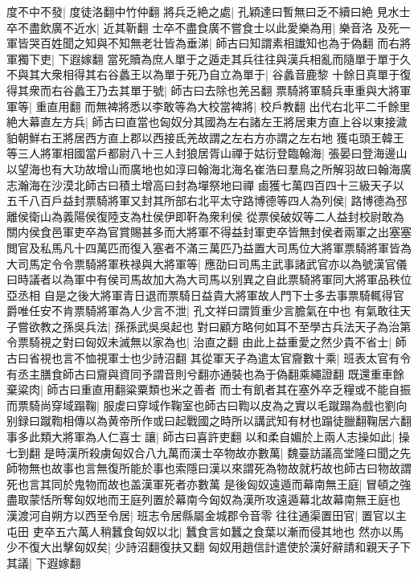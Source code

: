 度不中不發|{
	度徒洛翻中竹仲翻}
將兵乏絶之處|{
	孔穎達曰暫無曰乏不續曰絶}
見水士卒不盡飲廣不近水|{
	近其靳翻}
士卒不盡食廣不嘗食士以此愛樂為用|{
	樂音洛}
及死一軍皆哭百姓聞之知與不知無老壮皆為垂涕|{
	師古曰知謂素相䜟知也為于偽翻}
而右將軍獨下吏|{
	下遐嫁翻}
當死贖為庶人單于之遁走其兵往往與漢兵相亂而隨單于單于久不與其大衆相得其右谷蠡王以為單于死乃自立為單于|{
	谷蠡音鹿黎}
十餘日真單于復得其衆而右谷蠡王乃去其單于號|{
	師古曰去除也羌呂翻}
票騎將軍騎兵車重與大將軍軍等|{
	重直用翻}
而無裨將悉以李敢等為大校當裨將|{
	校戶教翻}
出代右北平二千餘里絶大幕直左方兵|{
	師古曰直當也匈奴分其國為左右諸左王將居東方直上谷以東接濊貃朝鮮右王將居西方直上郡以西接氐羌故謂之左右方亦謂之左右地}
獲屯頭王韓王等三人將軍相國當戶都尉八十三人封狼居胥山禪于姑衍登臨翰海|{
	張晏曰登海邊山以望海也有大功故增山而廣地也如淳曰翰海北海名崔浩曰羣鳥之所解羽故曰翰海廣志瀚海在沙漠北師古曰積土增高曰封為墠祭地曰禪}
鹵獲七萬四百四十三級天子以五千八百戶益封票騎將軍又封其所部右北平太守路博德等四人為列侯|{
	路博德為邳離侯衛山為義陽侯復陸支為杜侯伊即靬為衆利侯}
從票侯破奴等二人益封校尉敢為關内侯食邑軍吏卒為官賞賜甚多而大將軍不得益封軍吏卒皆無封侯者兩軍之出塞塞閲官及私馬凡十四萬匹而復入塞者不滿三萬匹乃益置大司馬位大將軍票騎將軍皆為大司馬定令令票騎將軍秩禄與大將軍等|{
	應劭曰司馬主武事諸武官亦以為號漢官儀曰時議者以為軍中有侯司馬故加大為大司馬以别異之自此票騎將軍同大將軍品秩位亞丞相}
自是之後大將軍青日退而票騎日益貴大將軍故人門下士多去事票騎輒得官爵唯任安不肯票騎將軍為人少言不泄|{
	孔文祥曰謂質重少言膽氣在中也}
有氣敢往天子嘗欲教之孫吳兵法|{
	孫孫武吳吳起也}
對曰顧方略何如耳不至學古兵法天子為治第令票騎視之對曰匈奴未滅無以家為也|{
	治直之翻}
由此上益重愛之然少貴不省士|{
	師古曰省視也言不恤視軍士也少詩沼翻}
其從軍天子為遣太官齎數十乘|{
	班表太官有令有丞主膳食師古曰齎與資同予謂音則兮翻亦通裝也為于偽翻乘繩證翻}
既還重車餘棄粱肉|{
	師古曰重直用翻粱粟類也米之善者}
而士有飢者其在塞外卒乏糧或不能自振而票騎尚穿域蹋鞠|{
	服䖍曰穿域作鞠室也師古曰鞫以皮為之實以毛蹴蹋為戲也劉向别録曰蹴鞫相傳以為黄帝所作或曰起戰國之時所以講武知有材也蹋徒臘翻鞠居六翻}
事多此類大將軍為人仁喜士讓|{
	師古曰喜許吏翻}
以和柔自媚於上兩人志操如此|{
	操七到翻}
是時漢所殺虜匈奴合八九萬而漢士卒物故亦數萬|{
	魏臺訪議高堂隆曰聞之先師物無也故事也言無復所能於事也索隱曰漢以來謂死為物故就朽故也師古曰物故謂死也言其同於鬼物而故也盖漢軍死者亦數萬}
是後匈奴遠遁而幕南無王庭|{
	冒頓之強盡取蒙恬所奪匈奴地而王庭列置於幕南今匈奴為漢所攻遠遁幕北故幕南無王庭也}
漢渡河自朔方以西至令居|{
	班志令居縣屬金城郡令音零}
往往通渠置田官|{
	置官以主屯田}
吏卒五六萬人稍蠶食匈奴以北|{
	蠶食言如蠶之食葉以漸而侵其地也}
然亦以馬少不復大出擊匈奴矣|{
	少詩沼翻復扶又翻}
匈奴用趙信計遣使於漢好辭請和親天子下其議|{
	下遐嫁翻}
